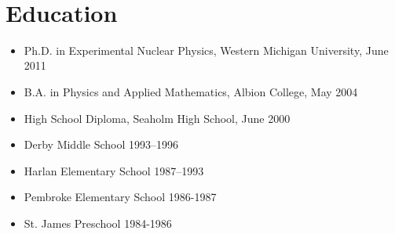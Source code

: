 \clearpage
\pagestyle{fancy}
%

\begin{changemargin}{\indent}
\nameaddress{\homeaddress}\\
\end{changemargin}
\section*{Education}
\begin{itemize}
		\item Ph.D. in Experimental Nuclear Physics, Western Michigan University, June 2011%
	\item B.A. in Physics and Applied Mathematics, Albion College, May 2004 %
	\item High School Diploma, Seaholm High School, June 2000 %
	\item Derby Middle School 1993--1996 %
	\item Harlan Elementary School 1987--1993 %
	\item Pembroke Elementary School 1986-1987 %
	\item St. James Preschool 1984-1986 %
\end{itemize}
